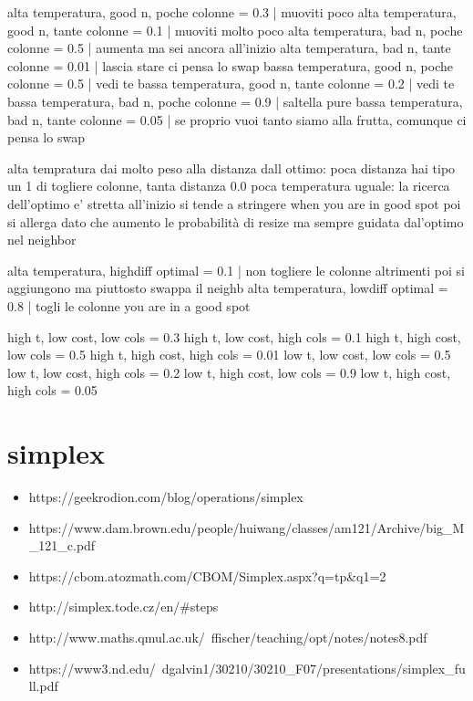 \documentclass[11pt]{article}
\begin{document}
    alta temperatura, good n, poche colonne = 0.3        | muoviti poco
    alta temperatura, good n, tante colonne = 0.1        | muoviti molto poco
    alta temperatura, bad n, poche colonne = 0.5         | aumenta ma sei ancora all'inizio
    alta temperatura, bad n, tante colonne = 0.01        | lascia stare ci pensa lo swap
    bassa temperatura, good n, poche colonne = 0.5       | vedi te
    bassa temperatura, good n, tante colonne = 0.2       | vedi te
    bassa temperatura, bad n, poche colonne = 0.9        | saltella pure 
    bassa temperatura, bad n, tante colonne = 0.05       | se proprio vuoi tanto siamo alla frutta, comunque ci pensa lo swap

    
    alta tempratura dai molto peso alla distanza dall ottimo: poca distanza hai tipo un 1 di togliere colonne, tanta distanza 0.0
    poca temperatura uguale: la ricerca dell'optimo e' stretta all'inizio si tende a stringere when you are in good spot
                                                    poi si allerga dato che aumento le probabilità di resize ma sempre guidata dal'optimo nel neighbor

    alta temperatura, highdiff optimal = 0.1             | non togliere le colonne altrimenti poi si aggiungono ma piuttosto swappa il neighb
    alta temperatura, lowdiff optimal = 0.8              | togli le colonne you are in a good spot
    
    

high t, low cost, low cols = 0.3  
high t, low cost, high cols = 0.1  
high t, high cost, low cols = 0.5   
high t, high cost, high cols = 0.01  
low t, low cost, low cols = 0.5 
low t, low cost, high cols = 0.2 
low t, high cost, low cols = 0.9  
low t, high cost, high cols = 0.05 


\section{simplex}
\begin{itemize}
    \item https://geekrodion.com/blog/operations/simplex
    \item https://www.dam.brown.edu/people/huiwang/classes/am121/Archive/big_M_121_c.pdf
    \item https://cbom.atozmath.com/CBOM/Simplex.aspx?q=tp&q1=2%
    \item http://simplex.tode.cz/en/#steps
    \item http://www.maths.qmul.ac.uk/~ffischer/teaching/opt/notes/notes8.pdf
    \item https://www3.nd.edu/~dgalvin1/30210/30210_F07/presentations/simplex_full.pdf
\end{itemize}
\end{document}
